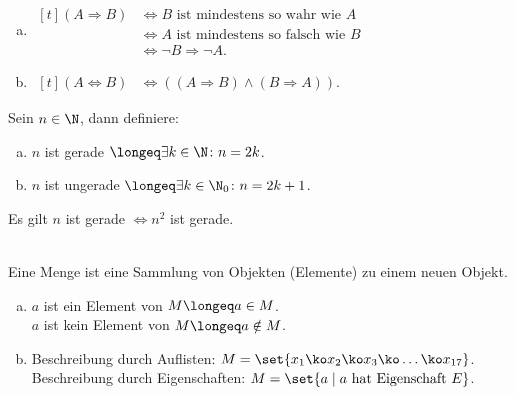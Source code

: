 \documentclass[../ana1.tex]{subfiles}
\begin{document}
\begin{bem}\leavevmode
	\begin{enumerate}[(a)]
		\item \(\begin{aligned}[t]
					(A \Rightarrow B) &\Leftrightarrow B \text{ ist mindestens so wahr wie } A\\
									&\Leftrightarrow A \text{ ist mindestens so falsch wie } B\\
									&\Leftrightarrow \neg B \Rightarrow \neg A.
			    \end{aligned}\)
		\item \(\begin{aligned}[t]
			    	(A \Leftrightarrow B) &\Leftrightarrow ((A \Rightarrow B) \wedge (B \Rightarrow A)).
			    \end{aligned}\)
	\end{enumerate}
\end{bem}
\begin{defi*}
	Sein \(n \in \N\), dann definiere:
	\begin{enumerate}[(a)]
		\item \(n\) ist gerade \(\longeq \exists k \in \N \colon n = 2k\).
		\item \(n\) ist ungerade \(\longeq \exists k \in \N_{0} \colon n = 2k + 1\).
	\end{enumerate}
\end{defi*}
\begin{bsp}
	Es gilt $n$ ist gerade \(\iff n^2\) ist gerade.
	\begin{bew}
	\end{bew}
\end{bsp}

\begin{defi*}\leavevmode\\
	Eine Menge ist eine Sammlung von Objekten (Elemente) zu einem neuen Objekt.
\end{defi*}

\begin{notation}\leavevmode
	\begin{enumerate}[(a)]
		\item \(a\) ist ein Element von \(M \longeq a \in M\).\\
			  \(a\) ist kein Element von \(M \longeq a \notin M\).
		\item Beschreibung durch Auflisten: \(M = \set{x_{1} \ko x_{2} \ko x_{3} \ko \ldots \ko x_{17}}\).\\
			  Beschreibung durch Eigenschaften: \(M = \set{a \; \vert \; a \text{ hat Eigenschaft } E}\).
	\end{enumerate}
\end{notation}
\end{document}
